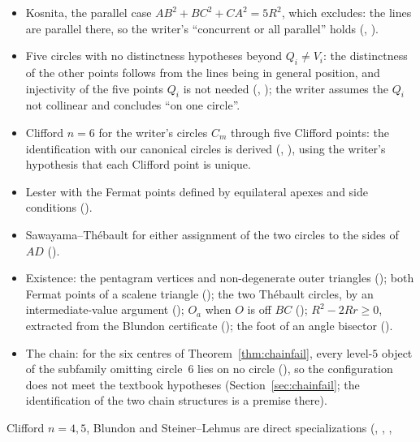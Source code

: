 \documentclass[11pt]{article}
\theoremstyle{definition}
\theoremstyle{remark}
\begin{document}
\begin{itemize}
\item Kosnita, the parallel case $AB^2+BC^2+CA^2=5R^2$, which  excludes: the lines
are parallel there, so the writer's ``concurrent or all parallel'' holds
(, ).
\item Five circles with no distinctness hypotheses beyond $Q_i\neq V_i$: the distinctness of the other
points follows from the lines being in general position, and injectivity of the five points $Q_i$ is not
needed (, ); the writer
assumes the $Q_i$ not collinear and concludes ``on one circle''.
\item Clifford $n=6$ for the writer's circles $C_m$ through five Clifford points: the identification with
our canonical circles is derived (,
), using the writer's hypothesis that each Clifford point is unique.
\item Lester with the Fermat points defined by equilateral apexes and side conditions
().
\item Sawayama--Th\'ebault for either assignment of the two circles to the sides of $AD$
().
\item Existence: the pentagram vertices and non-degenerate outer triangles
(); both Fermat points of a scalene triangle
(); the two Th\'ebault circles, by an intermediate-value argument
(); $O_a$ when $O$ is off $BC$
(); $R^2-2Rr\ge0$, extracted from the Blundon certificate
(); the foot of an angle bisector
().
\item The chain: for the six centres of Theorem~\ref{thm:chainfail}, every level-$5$ object of the
subfamily omitting circle~$6$ lies on no circle
(), so the configuration does not meet the
textbook hypotheses (Section~\ref{sec:chainfail}; the identification of the two chain structures is a
premise there).
\end{itemize}
Clifford $n=4,5$, Blundon and Steiner--Lehmus are direct specializations
(, , ,
\end{document}
